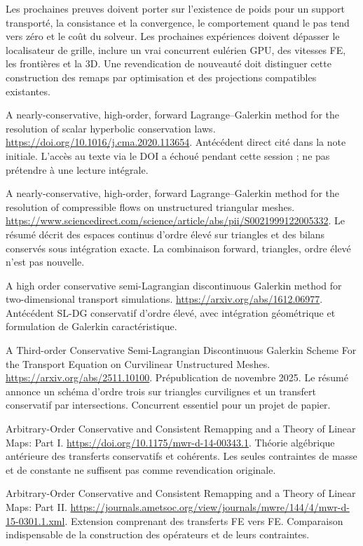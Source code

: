 \documentclass[10pt,a4paper]{article}
\begin{document}
Les prochaines preuves doivent porter sur l'existence de poids pour un support transporté, la consistance et la convergence, le comportement quand le pas tend vers zéro et le coût du solveur. Les prochaines expériences doivent dépasser le localisateur de grille, inclure un vrai concurrent eulérien GPU, des vitesses FE, les frontières et la 3D. Une revendication de nouveauté doit distinguer cette construction des remaps par optimisation et des projections compatibles existantes.

A nearly-conservative, high-order, forward Lagrange–Galerkin method for the resolution of scalar hyperbolic conservation laws. \url{https://doi.org/10.1016/j.cma.2020.113654}. Antécédent direct cité dans la note initiale. L'accès au texte via le DOI a échoué pendant cette session ; ne pas prétendre à une lecture intégrale.

A nearly-conservative, high-order, forward Lagrange–Galerkin method for the resolution of compressible flows on unstructured triangular meshes. \url{https://www.sciencedirect.com/science/article/abs/pii/S0021999122005332}. Le résumé décrit des espaces continus d'ordre élevé sur triangles et des bilans conservés sous intégration exacte. La combinaison forward, triangles, ordre élevé n'est pas nouvelle.

A high order conservative semi-Lagrangian discontinuous Galerkin method for two-dimensional transport simulations. \url{https://arxiv.org/abs/1612.06977}. Antécédent SL-DG conservatif d'ordre élevé, avec intégration géométrique et formulation de Galerkin caractéristique.

A Third-order Conservative Semi-Lagrangian Discontinuous Galerkin Scheme For the Transport Equation on Curvilinear Unstructured Meshes. \url{https://arxiv.org/abs/2511.10100}. Prépublication de novembre 2025. Le résumé annonce un schéma d'ordre trois sur triangles curvilignes et un transfert conservatif par intersections. Concurrent essentiel pour un projet de papier.

Arbitrary-Order Conservative and Consistent Remapping and a Theory of Linear Maps: Part I. \url{https://doi.org/10.1175/mwr-d-14-00343.1}. Théorie algébrique antérieure des transferts conservatifs et cohérents. Les seules contraintes de masse et de constante ne suffisent pas comme revendication originale.

Arbitrary-Order Conservative and Consistent Remapping and a Theory of Linear Maps: Part II. \url{https://journals.ametsoc.org/view/journals/mwre/144/4/mwr-d-15-0301.1.xml}. Extension comprenant des transferts FE vers FE. Comparaison indispensable de la construction des opérateurs et de leurs contraintes.
\end{document}
